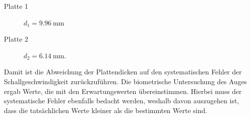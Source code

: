 \begin{description}
  \item[Platte 1] $d_1 = \SI{9.96}{\milli\meter}$
  \item[Platte 2] $d_2 = \SI{6.14}{\milli\meter}$.
\end{description}

Damit ist die Abweichung der Plattendicken auf den systematischen Fehler
der Schallgeschwindigkeit zurückzuführen.
Die biometrische Untersuchung des Auges ergab Werte, die
mit den Erwartungswerten übereinstimmen. Hierbei muss der
systematische Fehler ebenfalls bedacht werden, weshalb davon auszugehen
ist, dass die tatsächlichen Werte kleiner als die bestimmten Werte sind.
